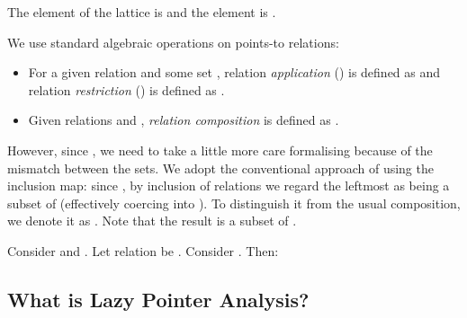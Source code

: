 \documentclass{llncs}
\newcommand{\lrestrict}[2]{\text{}}
\begin{document}
The  element of the lattice \text{} is \text{} and the  element is \text{}.



We use standard algebraic operations on points-to relations:
\begin{itemize}
\item  For a given relation \text{} and some set , 
       relation {\em application\/} (\text{}) is defined as
	\text{} 
        and relation {\em restriction\/} (\lrestrict{R}{X}) is defined as
        \text{}.

\item Given relations \text{} and \text{}, {\em relation composition\/} \text{} is defined as 
\text{}.
\end{itemize}

However, since \text{}, we need
to take a little more care formalising  because of the
mismatch between the sets. We adopt the conventional approach of
using the inclusion map: since \text{}, by
inclusion of relations we regard the leftmost  as being a subset
of \text{} (effectively coercing \text{} into \text{}). To distinguish it from
the usual composition, we denote it as \text{}.
Note that the result is a subset of \text{}.


Consider \text{} and
\text{}. Let relation \text{} be \text{}. Consider
\text{}. Then:




\subsection{What is Lazy Pointer Analysis?}
\label{sec:lazy.pta.definition}
\end{document}
